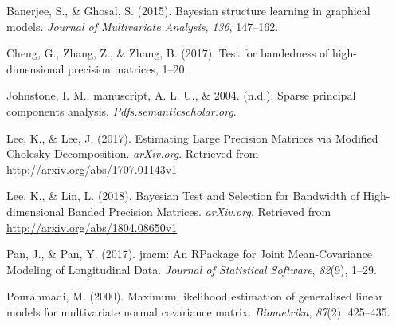 \documentclass[]{article}
\begin{document}
\leavevmode\hypertarget{ref-Banerjee:2015ex}{}%
Banerjee, S., \& Ghosal, S. (2015). Bayesian structure learning in
graphical models. \emph{Journal of Multivariate Analysis}, \emph{136},
147--162.

\leavevmode\hypertarget{ref-Cheng:2017jh}{}%
Cheng, G., Zhang, Z., \& Zhang, B. (2017). Test for bandedness of
high-dimensional precision matrices, 1--20.

\leavevmode\hypertarget{ref-Johnstone:tc}{}%
Johnstone, I. M., manuscript, A. L. U., \& 2004. (n.d.). Sparse
principal components analysis. \emph{Pdfs.semanticscholar.org}.

\leavevmode\hypertarget{ref-Lee:2017uq}{}%
Lee, K., \& Lee, J. (2017). Estimating Large Precision Matrices via
Modified Cholesky Decomposition. \emph{arXiv.org}. Retrieved from
\url{http://arxiv.org/abs/1707.01143v1}

\leavevmode\hypertarget{ref-Lee:2018vj}{}%
Lee, K., \& Lin, L. (2018). Bayesian Test and Selection for Bandwidth of
High-dimensional Banded Precision Matrices. \emph{arXiv.org}. Retrieved
from \url{http://arxiv.org/abs/1804.08650v1}

\leavevmode\hypertarget{ref-Pan:2017il}{}%
Pan, J., \& Pan, Y. (2017). jmcm: An RPackage for Joint Mean-Covariance
Modeling of Longitudinal Data. \emph{Journal of Statistical Software},
\emph{82}(9), 1--29.

\leavevmode\hypertarget{ref-Pourahmadi:2000fs}{}%
Pourahmadi, M. (2000). Maximum likelihood estimation of generalised
linear models for multivariate normal covariance matrix.
\emph{Biometrika}, \emph{87}(2), 425--435.
\end{document}
